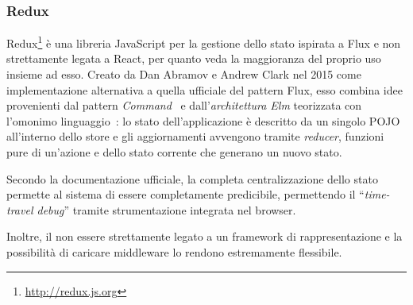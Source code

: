 \subsubsection{Redux}

Redux\footnote{\url{http://redux.js.org}} è una libreria JavaScript per la gestione dello stato ispirata a Flux e non strettamente legata a React, per quanto veda la maggioranza del proprio uso insieme ad esso.
Creato da Dan Abramov e Andrew Clark nel 2015 come implementazione alternativa a quella ufficiale del pattern Flux,
esso combina idee provenienti dal pattern \emph{Command}~\cite{10.5555/186897} e dall'\emph{architettura Elm} teorizzata con l'omonimo linguaggio~\cite{czaplicki2012elm}:
lo stato dell'applicazione è descritto da un singolo POJO all'interno dello store e gli aggiornamenti avvengono tramite \emph{reducer}, funzioni pure di un'azione e dello stato corrente che generano un nuovo stato.

Secondo la documentazione ufficiale, la completa centralizzazione dello stato permette al sistema di essere completamente predicibile, permettendo il ``\emph{time-travel debug}'' tramite strumentazione integrata nel browser.

Inoltre, il non essere strettamente legato a un framework di rappresentazione e la possibilità di caricare middleware lo rendono estremamente flessibile.
